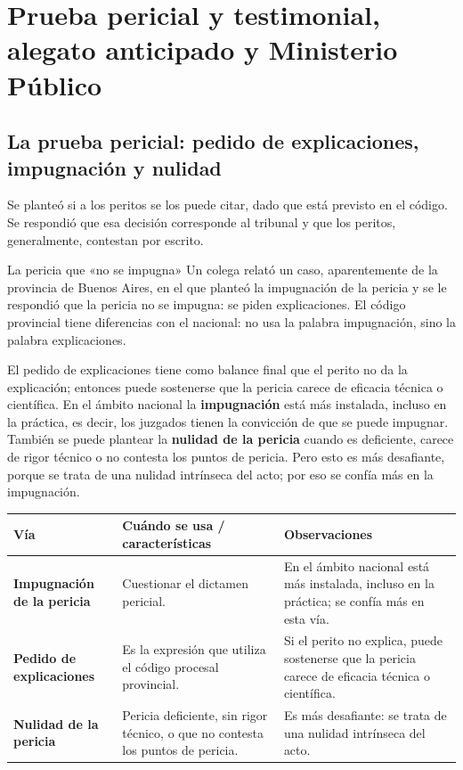 \documentclass[12pt,oneside]{book}
\begin{document}
\chapter[Prueba y Ministerio Público]{Prueba pericial y testimonial, alegato anticipado y Ministerio Público}

\section{La prueba pericial: pedido de explicaciones, impugnación y nulidad}

Se planteó si a los peritos se los puede citar, dado que está previsto en el código. Se respondió que esa decisión corresponde al tribunal y que los peritos, generalmente, contestan por escrito.

\begin{example}{La pericia que «no se impugna»}
Un colega relató un caso, aparentemente de la provincia de Buenos Aires, en el que planteó la impugnación de la pericia y se le respondió que la pericia no se impugna: se piden explicaciones. El código provincial tiene diferencias con el nacional: no usa la palabra impugnación, sino la palabra explicaciones.
\end{example}

El pedido de explicaciones tiene como balance final que el perito no da la explicación; entonces puede sostenerse que la pericia carece de eficacia técnica o científica. En el ámbito nacional la \textbf{impugnación} está más instalada, incluso en la práctica, es decir, los juzgados tienen la convicción de que se puede impugnar. También se puede plantear la \textbf{nulidad de la pericia} cuando es deficiente, carece de rigor técnico o no contesta los puntos de pericia. Pero esto es más desafiante, porque se trata de una nulidad intrínseca del acto; por eso se confía más en la impugnación.

\begin{table}[H]
\centering
\small
\begin{tabularx}{\textwidth}{L{0.20\textwidth} Y Y}
\toprule
\textbf{Vía} & \textbf{Cuándo se usa / características} & \textbf{Observaciones} \\
\midrule
\textbf{Impugnación de la pericia} & Cuestionar el dictamen pericial. & En el ámbito nacional está más instalada, incluso en la práctica; se confía más en esta vía. \\
\textbf{Pedido de explicaciones} & Es la expresión que utiliza el código procesal provincial. & Si el perito no explica, puede sostenerse que la pericia carece de eficacia técnica o científica. \\
\textbf{Nulidad de la pericia} & Pericia deficiente, sin rigor técnico, o que no contesta los puntos de pericia. & Es más desafiante: se trata de una nulidad intrínseca del acto. \\
\bottomrule
\end{tabularx}
\end{table}
\end{document}
